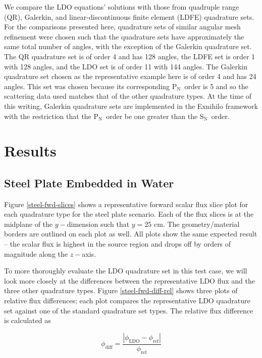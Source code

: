 \documentclass{article} %
\newcommand{\sn}{S$_\mathrm{N}$}
\newcommand{\pn}{P$_\mathrm{N}$}
\begin{document}
We compare the LDO equations' solutions with those from quadruple range (QR),
Galerkin, and linear-discontinuous finite element (LDFE) quadrature sets.
For the comparisons presented here, quadrature sets of similar angular mesh
refinement were chosen such that the quadrature sets have approximately the 
same total number of angles, with the exception of the Galerkin quadrature set.
The QR quadrature set is of order 4 and has 128 angles, the LDFE set is order 1
with 128 angles, and the LDO set is of order 11 with 144 angles. 
The Galerkin quadrature set chosen as the representative example here is of
order 4 and has 24 angles. This set was chosen because its corresponding \pn\
order is 5 and so the scattering data used matches that of the other quadrature
types. At the time of this writing, Galerkin quadrature sets are implemented in
the Exnihilo framework with the restriction that the \pn\ order be one greater
than the \sn\ order.

\section{Results}
\label{sec:results}

\subsection{Steel Plate Embedded in Water}

Figure \ref{steel-fwd-slices} shows a representative forward scalar flux slice
plot for each quadrature type for the steel plate scenario. 
Each of the flux slices is at the midplane of
the $y-$dimension such that $y = 25$ cm. The geometry/material borders are
outlined on each plot as well. All plots show the same expected result -- the
scalar flux is highest in the source region and drops off by orders of
magnitude along the $z-$axis.

To more thoroughly evaluate the LDO quadrature set in this test case, we will
look more closely at the differences between the representative LDO flux and
the three other quadrature types. Figure \ref{steel-fwd-diff-rel} shows three
plots of relative flux differences; each plot compares the representative LDO
quadrature set against one of the standard quadrature set types. The relative
flux difference is calculated as

\begin{equation}
\phi_{\mathrm{diff}} = 
\frac{\left|\phi_{\mathrm{LDO}}-\phi_{\mathrm{ref}}\right|}{\phi_{\mathrm{ref}}}
\label{flux-diff}
\end{equation}
\end{document}

